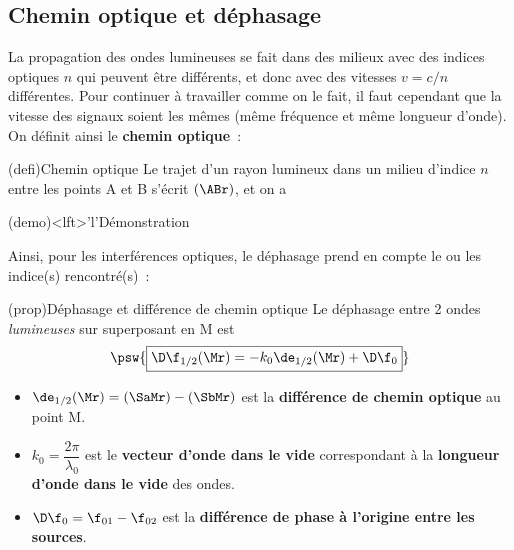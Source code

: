 \documentclass[../../main/main.tex]{subfiles}
\begin{document}
\vspace{-10pt}
\subsection{Chemin optique et déphasage}
La propagation des ondes lumineuses se fait dans des milieux avec des indices
optiques $n$ qui peuvent être différents, et donc avec des vitesses $v = c/n$
différentes. Pour continuer à travailler comme on le fait, il faut cependant que
la vitesse des signaux soient les mêmes (même fréquence et même longueur d'onde).
On définit ainsi le \textbf{chemin optique}~:
\begin{tcb}(defi){Chemin optique}
	Le trajet d'un rayon lumineux dans un milieu d'indice $n$ entre les points A
	et B s'écrit $(\ABr)$, et on a
	\psw{
		\[
			(\ABr) = n \cdot \ABr
		\]
	}
	\vspace{-15pt}
\end{tcb}

\begin{tcb}(demo)<lft>'l'{Démonstration}
\end{tcb}

Ainsi, pour les interférences optiques, le déphasage prend en
compte le ou les indice(s) rencontré(s)~:

\begin{tcb}(prop){Déphasage et différence de chemin optique}
	Le déphasage entre 2 ondes \textit{lumineuses} sur superposant en M est
	\[\psw{\boxed{\D\f_{1/2}(\Mr) = -k_0\de_{1/2}(\Mr) + \D\f_0}}\]
	\begin{itemize}
		\item $\de_{1/2}(\Mr) = (\SaMr) - (\SbMr)$ est la \textbf{différence de
			      chemin optique} au point M.
		\item $k_0 = \dfrac{2\pi}{\lambda_0}$ est le \textbf{vecteur d'onde dans
			      le vide} correspondant à la \textbf{longueur d'onde dans le vide}
		      des ondes.
		\item $\D\f_0 = \f_{01}-\f_{02}$ est la \textbf{différence de phase à
			      l'origine entre les sources}.
	\end{itemize}
\end{tcb}
\end{document}
